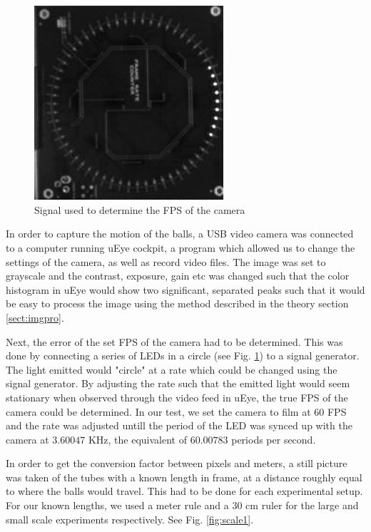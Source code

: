 \documentclass[11pt,a4paper]{article}
\begin{document}
    \begin{figure}[H]
      \center
      \includegraphics[width=7cm]{scripts/figs/sync_fps.png}
      \caption{Signal used to determine the FPS of the camera}
      \label{fig:FpsSignal}
    \end{figure}
  
    In order to capture the motion of the balls, a USB video camera was connected to a computer running uEye cockpit\cite{_ueye_????}, a program which allowed us to change the settings of the camera, as well as record video files. The image was set to grayscale and the contrast, exposure, gain etc was changed such that the color histogram in uEye would show two significant, separated peaks such that it would be easy to process the image using the method described in the theory section \ref{sect:imgpro}.

    Next, the error of the set FPS of the camera had to be determined. This was done by connecting a series of LEDs in a circle (see Fig. \ref{fig:FpsSignal}) to a signal generator. The light emitted would "circle" at a rate which could be changed using the signal generator. By adjusting the rate such that the emitted light would seem stationary when observed through the video feed in uEye, the true FPS of the camera could be determined. In our test, we set the camera to film at 60 FPS and the rate was adjusted untill the period of the LED was synced up with the camera at $3.60047$ KHz, the equivalent of $60.00783$ periods per second.

    In order to get the conversion factor between pixels and meters, a still picture was taken of the tubes with a known length in frame, at a distance roughly equal to where the balls would travel. This had to be done for each experimental setup. For our known lengths, we used a meter rule and a $30$ cm ruler for the large and small scale experiments respectively. See Fig. \ref{fig:scale1}.
\end{document}
